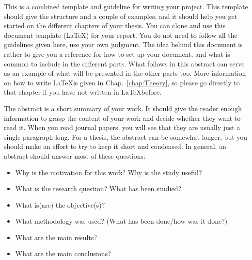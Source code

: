 This is a combined template and guideline for writing your project. This template should give the structure and a couple of examples, and it should help you get started on the different chapters of your thesis. You can clone and use this document template (\LaTeX) for your report. You do not need to follow all the guidelines given here, use your own judgment. The idea behind this document is rather to give you a reference for how to set up your document, and what is common to include in the different parts. What follows in this abstract can serve as an example of what will be presented in the other parts too. More information on how to write \LaTeX is given in Chap.~\ref{chap:Theory}, so please go directly to that chapter if you have not written in \LaTeX before.

The abstract is a short summary of your work. It should give the reader enough information to grasp the content of your work and decide whether they want to read it. When you read journal papers, you will see that they are usually just a single paragraph long. For a thesis, the abstract can be somewhat longer, but you should make an effort to try to keep it short and condensed. In general, an abstract should answer most of these questions:
\begin{itemize}
\item Why is the motivation for this work? Why is the study useful?
\item What is the research question? What has been studied?
\item What is(are) the objective(s)?
\item What methodology was used? (What has been done/how was it done?)
\item What are the main results?
\item What are the main conclusions?
\end{itemize}

